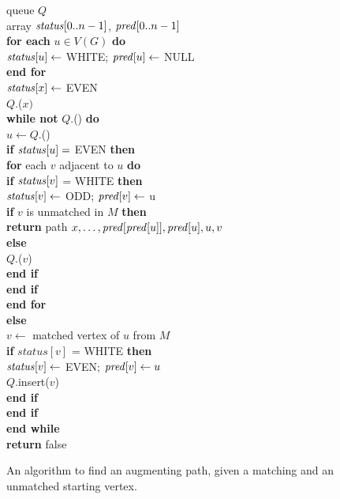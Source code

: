 \begin{figure}
{
 \> queue $Q$\\
 \> array $\operatorname{\text{\textit{status}}}[0..n-1]$, $\operatorname{\text{\textit{pred}}}[0..n-1]$ \\
 \> \textbf{for each} $u \in V(G)$ \textbf{do} \\
  \> \> $\operatorname{\text{\textit{status}}}[u] \gets $ WHITE; $\operatorname{\text{\textit{pred}}}[u] \gets $ NULL \\
 \> \textbf{end for}\\
 \> $\operatorname{\text{\textit{status}}}[x] \gets $ EVEN\\
 \> $Q$.($x)$ \\
 \> \textbf{while not} $Q$.() \textbf{do}\\
 \> \> $u \gets Q$.()\\
 \> \> \textbf{if} $\operatorname{\text{\textit{status}}}[u] =$ EVEN \textbf{then} \\
 \> \> \> \textbf{for} each $v$ adjacent to $u$ \textbf{do} \\
 \> \> \> \> \textbf{if} $\operatorname{\text{\textit{status}}}[v]$ = WHITE \textbf{then} \\
 \> \> \> \> \> $\operatorname{\text{\textit{status}}}[v] \gets$ ODD; $\operatorname{\text{\textit{pred}}}[v] \gets$ u \\
 \> \> \> \> \> \textbf{if} $v$ is unmatched in $M$ \textbf{then} \\
 \> \> \> \> \> \> \textbf{return} path $x,\ldots, \operatorname{\text{\textit{pred}}}[\operatorname{\text{\textit{pred}}}[u]], \operatorname{\text{\textit{pred}}}[u], u, v$\\
 \> \> \> \> \> \textbf{else}\\
 \> \> \> \> \> \> $Q$.($v$) \\
 \> \> \> \> \> \textbf{end if}\\
 \> \> \> \> \textbf{end if}\\
 \> \> \> \textbf{end for} \\
  \> \> \textbf{else}\hspace*{1.5cm}  \\
 \> \> \> $v \gets$ matched vertex of $u$ from $M$ \\
 \> \> \> \textbf{if} $status[v]$ = WHITE \textbf{then} \\
 \> \> \> \> $\operatorname{\text{\textit{status}}}[v] \gets$ EVEN; $\operatorname{\text{\textit{pred}}}[v] \gets u$ \\
 \> \> \> \> $Q$.insert($v$) \\
 \> \> \> \textbf{end if}\\
% 
 \> \> \textbf{end if}\\
 \> \textbf{end while}\\
 \> \textbf{return} false\hspace*{1cm}\\
}
\caption[An algorithm to find an augmenting path.]%
{An algorithm to find an augmenting path, given a matching
and an unmatched starting vertex.}
\label{fig:augpath}
\end{figure}

